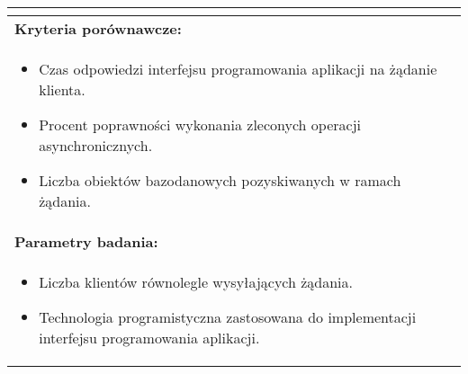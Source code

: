 \begin{longtable}[c]{|llll|}
{\begin{itemize}[label={}]
          \end{itemize}
    }                                                           \\ \hline
    \multicolumn{4}{|l|}{\textbf{Kryteria porównawcze:}}                             \\ \hline
    \multicolumn{4}{|p{\linewidth}|}{
        \begin{itemize}
            \item Czas odpowiedzi interfejsu programowania aplikacji na żądanie klienta.
            \item Procent poprawności wykonania zleconych operacji asynchronicznych.
            \item Liczba obiektów bazodanowych pozyskiwanych w ramach żądania.
        \end{itemize}
    }                                                           \\ \hline
    \multicolumn{4}{|l|}{\textbf{Parametry badania:}}                                \\ \hline
    \multicolumn{4}{|p{\linewidth}|}{
        \begin{itemize}
            \item Liczba klientów równolegle wysyłających żądania.
            \item Technologia programistyczna zastosowana do implementacji interfejsu programowania aplikacji.
        \end{itemize}
    }                                                           \\ \hline
\end{longtable}

\clearpage

